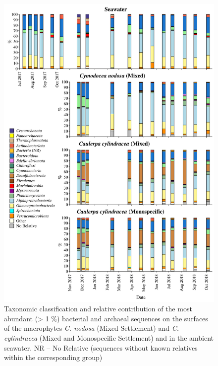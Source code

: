 \documentclass[12pt,]{article}
\begin{document}
\begin{figure}[H]

{\centering \includegraphics[width=0.85\linewidth]{../results/figures/community_bar_plot} 

}

\caption{Taxonomic classification and relative contribution of the most abundant (> 1 \si{\percent}) bacterial and archaeal sequences on the surfaces of the macrophytes \textit{C. nodosa} (Mixed Settlement) and \textit{C. cylindracea} (Mixed and Monospecific Settlement) and in the ambient seawater. NR -- No Relative (sequences without known relatives within the corresponding group)\label{community}}\label{fig:unnamed-chunk-4}
\end{figure}
\end{document}

